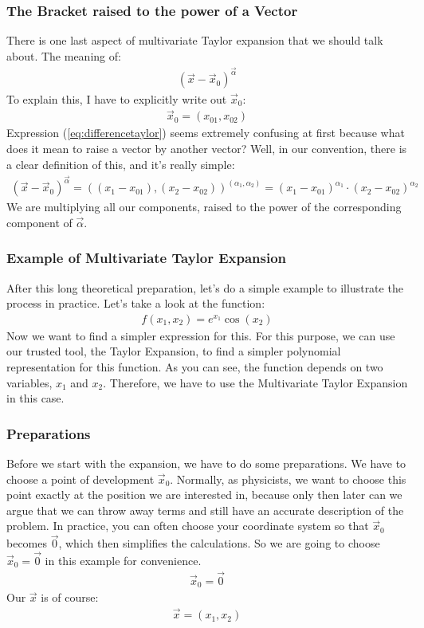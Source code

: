 \documentclass{article}
\begin{document}
	\subsubsection*{The Bracket raised to the power of a Vector}
	There is one last aspect of multivariate Taylor expansion that we should talk about. The meaning of:
	\begin{align}\label{eq:differencetaylor}
		(\vec{x}-\vec{x}_0)^{\vec{\alpha}}
	\end{align}
	To explain this, I have to explicitly write out $\vec{x}_0$:
	\begin{align}
		\vec{x}_0=(x_{01}, x_{02})
	\end{align}
	Expression (\ref{eq:differencetaylor}) seems extremely confusing at first because what does it mean to raise a vector by another vector? Well, in our convention, there is a clear definition of this, and it's really simple:
	\begin{align}
		(\vec{x}-\vec{x}_0)^{\vec{\alpha}} = \left((x_1-x_{01}), (x_2-x_{02})\right)^{(\alpha_1, \alpha_2)} = (x_1-x_{01})^{\alpha_1}\cdot(x_2-x_{02})^{\alpha_2}
	\end{align}
	We are multiplying all our components, raised to the power of the corresponding component of $\vec{\alpha}$.
	
	\subsubsection*{Example of Multivariate Taylor Expansion}
	After this long theoretical preparation, let's do a simple example to illustrate the process in practice.
	Let's take a look at the function:
	\begin{align}
		f(x_1,x_2) = e^{x_1} \cos(x_2)    
	\end{align}
	Now we want to find a simpler expression for this. For this purpose, we can use our trusted tool, the Taylor Expansion, to find a simpler polynomial representation for this function. As you can see, the function depends on two variables, $x_1$ and $x_2$. Therefore, we have to use the Multivariate Taylor Expansion in this case.
	
	\subsubsection*{Preparations}
	Before we start with the expansion, we have to do some preparations. We have to choose a point of development $\vec{x}_0$. Normally, as physicists, we want to choose this point exactly at the position we are interested in, because only then later can we argue that we can throw away terms and still have an accurate description of the problem. In practice, you can often choose your coordinate system so that $\vec{x}_0$ becomes $\vec{0}$, which then simplifies the calculations. So we are going to choose $\vec{x}_0=\vec{0}$ in this example for convenience.
	\begin{align}
		\vec{x}_0= \vec{0}
	\end{align}
	Our $\vec{x}$ is of course:
	\begin{align}
		\vec{x}=(x_1, x_2)
	\end{align}
	
\end{document}
